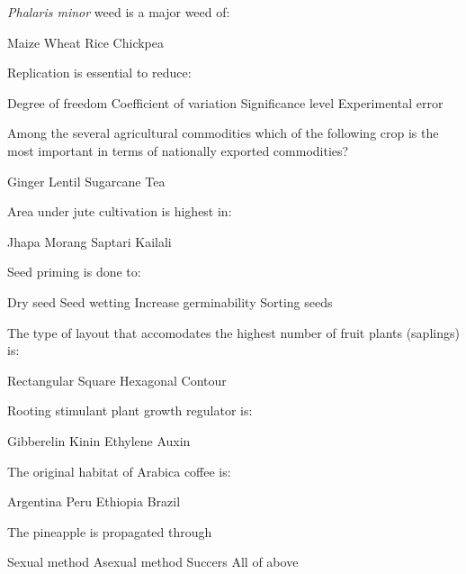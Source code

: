 \begin{questions}
\question \textit{Phalaris minor} weed is a major weed of:
  \begin{choices}
  \choice Maize
  \choice Wheat
  \choice Rice
  \choice Chickpea
  \end{choices}

\question Replication is essential to reduce:
  \begin{choices}
  \choice Degree of freedom
  \choice Coefficient of variation
  \choice Significance level
  \choice Experimental error
  \end{choices}

\question Among the several agricultural commodities which of the following crop is the most important in terms of nationally exported commodities?
  \begin{choices}
  \choice Ginger
  \choice Lentil
  \choice Sugarcane
  \choice Tea
  \end{choices}

\question Area under jute cultivation is highest in:
  \begin{choices}
  \choice Jhapa
  \choice Morang
  \choice Saptari
  \choice Kailali
  \end{choices}

\question Seed priming is done to:
  \begin{choices}
  \choice Dry seed
  \choice Seed wetting
  \choice Increase germinability
  \choice Sorting seeds
  \end{choices}

\question The type of layout that accomodates the highest number of fruit plants (saplings) is:
  \begin{choices}
  \choice Rectangular
  \choice Square
  \choice Hexagonal
  \choice Contour
  \end{choices}

\question Rooting stimulant plant growth regulator is:
  \begin{choices}
  \choice Gibberelin
  \choice Kinin
  \choice Ethylene
  \choice Auxin
  \end{choices}

\question The original habitat of Arabica coffee is:
  \begin{choices}
  \choice Argentina
  \choice Peru
  \choice Ethiopia
  \choice Brazil
  \end{choices}

\question The pineapple is propagated through \fillin[][3cm]
  \begin{choices}
  \choice Sexual method
  \choice Asexual method
  \choice Succers
  \choice All of above
  \end{choices}


\end{questions}

